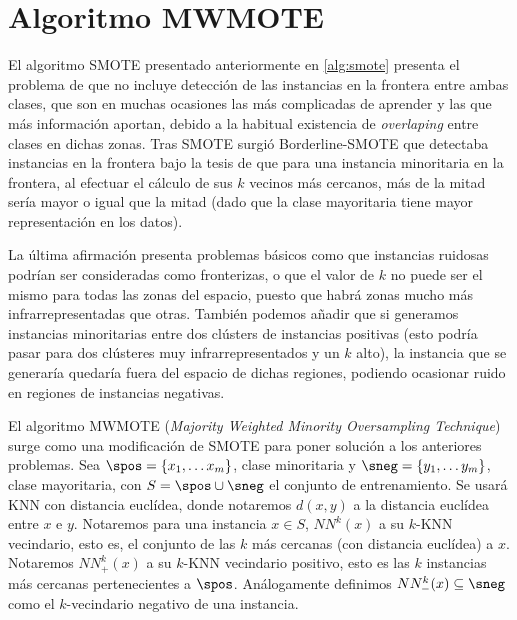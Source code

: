 \section{Algoritmo MWMOTE}
El algoritmo SMOTE presentado anteriormente en \ref{alg:smote} presenta el problema de que no incluye detección de
las instancias en la frontera entre ambas clases, que son en muchas ocasiones las más complicadas de aprender y las que más
información aportan, debido a la habitual existencia de \textit{overlaping} entre clases en dichas zonas. Tras SMOTE surgió
Borderline-SMOTE que detectaba instancias en la frontera bajo la tesis de que para una instancia minoritaria en la frontera,
al efectuar el cálculo de sus $k$ vecinos más cercanos, más de la mitad sería mayor o igual que la mitad (dado que la
clase mayoritaria tiene mayor representación en los datos).

La última afirmación presenta problemas básicos como que instancias ruidosas podrían ser consideradas como fronterizas, o que
el valor de $k$ no puede ser el mismo para todas las zonas del espacio, puesto que habrá zonas mucho más infrarrepresentadas
que otras. También podemos añadir que si generamos instancias minoritarias entre dos clústers de instancias positivas (esto 
podría pasar para dos clústeres muy infrarrepresentados y un $k$ alto), la instancia que se generaría quedaría fuera del 
espacio de dichas regiones, podiendo ocasionar ruido en regiones de instancias negativas.

El algoritmo MWMOTE (\textit{Majority Weighted Minority Oversampling Technique}) surge como una modificación de SMOTE para poner 
solución a los anteriores problemas. Sea $\spos = \{x_1, \ldots x_m\}$, clase minoritaria y $\sneg = \{y_1, \ldots y_m\}$, 
clase mayoritaria, con $S= \spos \cup \sneg$ el conjunto de entrenamiento. Se usará KNN con distancia euclídea, donde notaremos
$d(x,y)$ a la distancia euclídea entre $x$ e $y$. Notaremos para una instancia $x\in S$, $NN^{k}(x)$ a su $k$-KNN vecindario, 
esto es, el conjunto de las $k$ más cercanas (con distancia euclídea) a $x$. Notaremos $NN_{+}^k(x)$ a su $k$-KNN vecindario 
positivo, esto es las $k$ instancias más cercanas pertenecientes a $\spos$. Análogamente definimos $NN_{-}^k(x) \subseteq \sneg$ 
como el $k$-vecindario negativo de una instancia.

